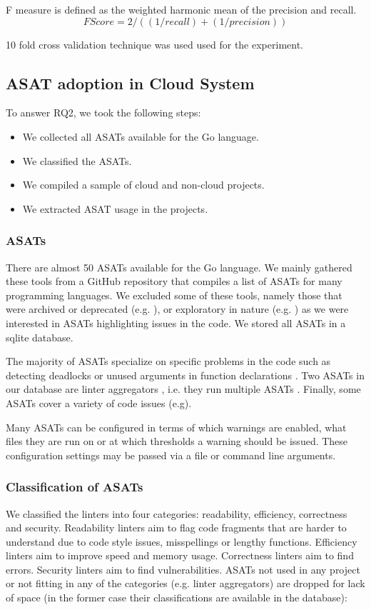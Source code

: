 \documentclass{seal_article}
\begin{document}
F measure is defined as the weighted harmonic mean of the 
precision and recall. 
\[ F Score = 2 / ((1/recall)+(1/precision)) \]

10 fold cross validation technique was used used for the experiment.

\subsection{ASAT adoption in Cloud System}
To answer RQ2, we took the following steps:
\begin{itemize}
    \item We collected all ASATs available for the Go language.
    \item We classified the ASATs.
    \item We compiled a sample of cloud and non-cloud projects.
    \item We extracted ASAT usage in the projects.
\end{itemize}

\subsubsection{ASATs}
There are almost 50 ASATs available for the Go language. We mainly gathered these tools from a GitHub repository \cite{awesome_asat} that compiles a list of ASATs for many programming languages. We excluded some of these tools, namely those that were archived or deprecated (e.g. \cite{interfacer}), or exploratory in nature (e.g. \cite{goroutine}) as we were interested in ASATs highlighting issues in the code. We stored all ASATs in a sqlite database.

The majority of ASATs specialize on specific problems in the code such as detecting deadlocks \cite{dingo-hunter} or unused arguments in function declarations \cite{nargs}. Two ASATs in our database are linter aggregators , i.e. they run multiple ASATs \cite{goreporter,golangci-lint}. Finally, some ASATs cover a variety of code issues (e.g\cite{staticcheck}). 

Many ASATs can be configured in terms of which warnings are enabled, what files they are run on or at which thresholds a warning should be issued. These configuration settings may be passed via a file or command line arguments.

\subsubsection{Classification of ASATs}
We classified the linters into four categories: readability, efficiency, correctness and security. Readability linters aim to flag code fragments that are harder to understand due to code style issues, misspellings or lengthy functions. Efficiency linters aim to improve speed and memory usage. Correctness linters aim to find errors. Security linters aim to find vulnerabilities. ASATs not used in any project or not fitting in any of the categories (e.g. linter aggregators) are dropped for lack of space (in the former case their classifications are available in the database): \\
\end{document}
